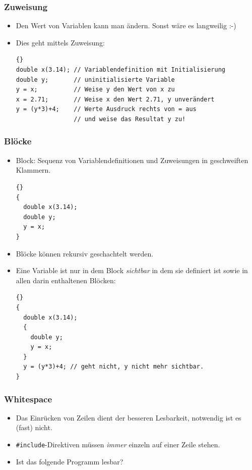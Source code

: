 \documentclass[ignorenonframetext,12pt]{beamer}
\theoremstyle{definition}
\theoremstyle{definition}
\begin{document}
\begin{frame}[fragile]
\frametitle{Zuweisung}
\begin{itemize}
\item Den Wert von Variablen kann man ändern. Sonst wäre es langweilig
  :-)
\item Dies geht mittels Zuweisung:
{\scriptsize\begin{lstlisting}{}
double x(3.14); // Variablendefinition mit Initialisierung
double y;       // uninitialisierte Variable
y = x;          // Weise y den Wert von x zu
x = 2.71;       // Weise x den Wert 2.71, y unverändert
y = (y*3)+4;    // Werte Ausdruck rechts von = aus
                // und weise das Resultat y zu!
\end{lstlisting}}
\end{itemize}
\end{frame}

\begin{frame}[fragile]
\frametitle{Blöcke}
\begin{itemize}
\item Block: Sequenz von Variablendefinitionen und Zuweisungen in
  geschweiften Klammern.
{\scriptsize\begin{lstlisting}{}
{
  double x(3.14);
  double y;
  y = x;
}
\end{lstlisting}}
\item Blöcke können rekursiv geschachtelt werden.
\item Eine Variable ist nur in dem Block \textsl{sichtbar} in dem sie
  definiert ist sowie in allen darin enthaltenen Blöcken:
{\scriptsize\begin{lstlisting}{}
{
  double x(3.14);
  {
    double y;
    y = x;
  }
  y = (y*3)+4; // geht nicht, y nicht mehr sichtbar.
}
\end{lstlisting}}
\end{itemize}
\end{frame}

\begin{frame}[fragile]
\frametitle{Whitespace}
\begin{itemize}
\item Das Einrücken von Zeilen dient der besseren Lesbarkeit,
  notwendig ist es (fast) nicht.
\item \lstinline{#include}-Direktiven müssen \textsl{immer} einzeln
  auf einer Zeile stehen.
\item Ist das folgende Programm lesbar?

\end{itemize}
\end{frame}
\end{document}
